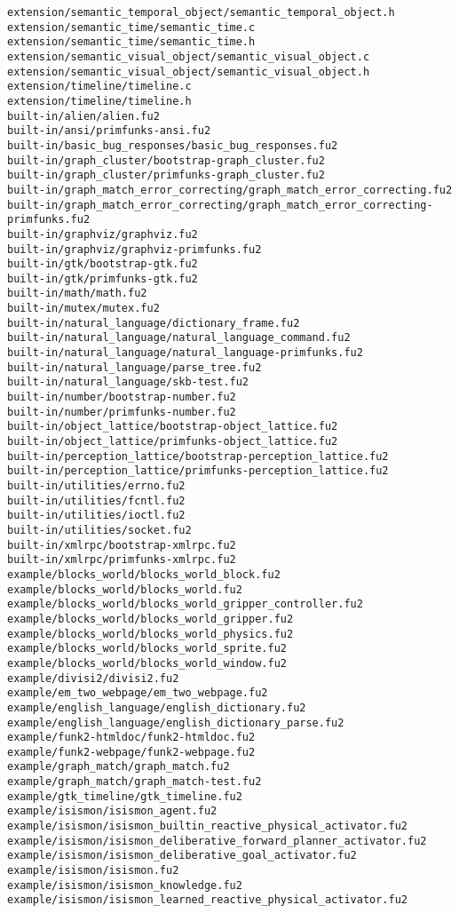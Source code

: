 \begin{lstlisting}
extension/semantic_temporal_object/semantic_temporal_object.h
extension/semantic_time/semantic_time.c
extension/semantic_time/semantic_time.h
extension/semantic_visual_object/semantic_visual_object.c
extension/semantic_visual_object/semantic_visual_object.h
extension/timeline/timeline.c
extension/timeline/timeline.h
built-in/alien/alien.fu2
built-in/ansi/primfunks-ansi.fu2
built-in/basic_bug_responses/basic_bug_responses.fu2
built-in/graph_cluster/bootstrap-graph_cluster.fu2
built-in/graph_cluster/primfunks-graph_cluster.fu2
built-in/graph_match_error_correcting/graph_match_error_correcting.fu2
built-in/graph_match_error_correcting/graph_match_error_correcting-primfunks.fu2
built-in/graphviz/graphviz.fu2
built-in/graphviz/graphviz-primfunks.fu2
built-in/gtk/bootstrap-gtk.fu2
built-in/gtk/primfunks-gtk.fu2
built-in/math/math.fu2
built-in/mutex/mutex.fu2
built-in/natural_language/dictionary_frame.fu2
built-in/natural_language/natural_language_command.fu2
built-in/natural_language/natural_language-primfunks.fu2
built-in/natural_language/parse_tree.fu2
built-in/natural_language/skb-test.fu2
built-in/number/bootstrap-number.fu2
built-in/number/primfunks-number.fu2
built-in/object_lattice/bootstrap-object_lattice.fu2
built-in/object_lattice/primfunks-object_lattice.fu2
built-in/perception_lattice/bootstrap-perception_lattice.fu2
built-in/perception_lattice/primfunks-perception_lattice.fu2
built-in/utilities/errno.fu2
built-in/utilities/fcntl.fu2
built-in/utilities/ioctl.fu2
built-in/utilities/socket.fu2
built-in/xmlrpc/bootstrap-xmlrpc.fu2
built-in/xmlrpc/primfunks-xmlrpc.fu2
example/blocks_world/blocks_world_block.fu2
example/blocks_world/blocks_world.fu2
example/blocks_world/blocks_world_gripper_controller.fu2
example/blocks_world/blocks_world_gripper.fu2
example/blocks_world/blocks_world_physics.fu2
example/blocks_world/blocks_world_sprite.fu2
example/blocks_world/blocks_world_window.fu2
example/divisi2/divisi2.fu2
example/em_two_webpage/em_two_webpage.fu2
example/english_language/english_dictionary.fu2
example/english_language/english_dictionary_parse.fu2
example/funk2-htmldoc/funk2-htmldoc.fu2
example/funk2-webpage/funk2-webpage.fu2
example/graph_match/graph_match.fu2
example/graph_match/graph_match-test.fu2
example/gtk_timeline/gtk_timeline.fu2
example/isismon/isismon_agent.fu2
example/isismon/isismon_builtin_reactive_physical_activator.fu2
example/isismon/isismon_deliberative_forward_planner_activator.fu2
example/isismon/isismon_deliberative_goal_activator.fu2
example/isismon/isismon.fu2
example/isismon/isismon_knowledge.fu2
example/isismon/isismon_learned_reactive_physical_activator.fu2

\end{lstlisting}
